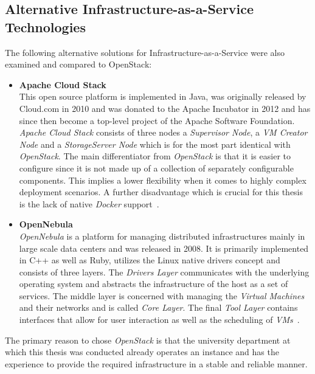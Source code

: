 \subsection{Alternative Infrastructure-as-a-Service Technologies}
The following alternative solutions for Infrastructure-as-a-Service were also examined and compared to OpenStack:
\begin{itemize}
    \item[]{\textbf{Apache Cloud Stack}\\
    This open source platform is implemented in Java, was originally released by Cloud.com in 2010 and was donated to the Apache Incubator in 2012 and has since then become a top-level project of the Apache Software Foundation.
    \textit{Apache Cloud Stack} consists of three nodes a \textit{Supervisor Node}, a \textit{VM Creator Node} and a \textit{StorageServer Node} which is for the most part identical with \textit{OpenStack}.
    The main differentiator from \textit{OpenStack} is that it is easier to configure since it is not made up of a collection of separately configurable components.
    This implies a lower flexibility when it comes to highly complex deployment scenarios.
    A further disadvantage which is crucial for this thesis is the lack of native \textit{Docker} support~\cite{cloud_stack, cloud_stack2}.
    }
    \item[]{\textbf{OpenNebula}\\
    \textit{OpenNebula} is a platform for managing distributed infrastructures mainly in large scale data centers and was released in 2008.
    It is primarily implemented in C++ as well as Ruby, utilizes the Linux native drivers concept and consists of three layers.
    The \textit{Drivers Layer} communicates with the underlying operating system and abstracts the infrastructure of the host as a set of services.
    The middle layer is concerned with managing the \textit{Virtual Machines} and their networks and is called \textit{Core Layer}.
    The final \textit{Tool Layer} contains interfaces that allow for user interaction as well as the scheduling of \textit{VMs}~\cite{open_nebula, open_nebula2}.
    }
\end{itemize}
The primary reason to chose \textit{OpenStack} is that the university department at which this thesis was conducted already operates an instance and has the experience to provide the required infrastructure in a stable and reliable manner.

